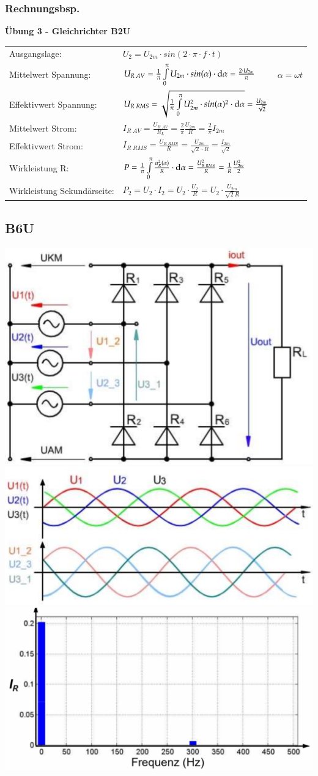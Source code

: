 \subsubsection{Rechnungsbsp.}
\textbf{Übung 3 - Gleichrichter B2U}\newline
\renewcommand{\arraystretch}{2}
\begin{tabular}{ p{}  p{}  p{}}
    Ausgangslage:&
    $ U_2= U_{2m}\cdot sin(2\cdot \pi\cdot f\cdot t)$&
    \\
    Mittelwert Spannung: &
    $ U_{R \; AV}= \frac{1}{\pi} \int\limits_{0}^{\pi} U_{2m}\cdot sin(\alpha)\cdot\mathop{}\!\mathrm{d}\alpha=\frac{2\cdot U_{2m}}{\pi} $ &
    $ \alpha=\omega t $
    \\
    
    Effektivwert Spannung:   &
    $ U_{R \; RMS}= \sqrt{\frac{1}{\pi}\int\limits_{0}^{\pi} U_{2m}^2\cdot sin(\alpha)^2\cdot\mathop{}\!\mathrm{d}\alpha} = \frac{U_{2m}}{\sqrt{2}} $ &
    \\ 
    
    Mittelwert Strom: &
    $ I_{R \; AV}=\frac{U_{R \; AV}}{R_L}= \frac{2}{\pi}\frac{U_{2m}}{R}= \frac{2}{\pi} I_{2m} $ &
    \\
    
    Effektivwert Strom: &
    $ I_{R \; RMS}=\frac{U_{R \; RMS}}{R}= \frac{U_{2m}}{\sqrt{2}\cdot R}= \frac{I_{2m}}{\sqrt{2}} $ &
    \\
    
    Wirkleistung R: &
    $ P= \frac{1}{\pi}\int\limits_{0}^{\pi}\frac{u_R^2(\alpha)}{R}\cdot \mathop{}\!\mathrm{d} \alpha = \frac{U_{R \; RMS}^2}{R}=\frac{1}{R}\frac{U_{2m}^2}{2} $&
    \\
    Wirkleistung Sekundärseite: &
    $P_2=U_2\cdot I_2=U_2\cdot \frac{U_2}{R}=U_2\cdot \frac{U_{2m}}{\sqrt{2}R}$&
    \\
\end{tabular}
\renewcommand{\arraystretch}{1}


\subsection{B6U}
\includegraphics[width=0.3\linewidth]{images/PrakUGB6}
\includegraphics[width=0.3\linewidth]{images/PrakUGB6Kl1}
\includegraphics[width=0.3\linewidth]{images/UGB6OW}\newline
\clearpage